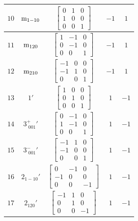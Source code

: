 \documentclass[fleqn,8pt]{jsarticle}
\begin{document}
\begin{longtable}{ccccc}
$ 10 $ & $ {\rm m}_{1-10} $ & $ \begin{bmatrix} 0 & 1 & 0 \\ 1 & 0 & 0 \\ 0 & 0 & 1 \end{bmatrix} $ & $ -1 $ & $ 1 $ \\ \hline
$ 11 $ & $ {\rm m}_{120} $ & $ \begin{bmatrix} 1 & -1 & 0 \\ 0 & -1 & 0 \\ 0 & 0 & 1 \end{bmatrix} $ & $ -1 $ & $ 1 $ \\ \hline
$ 12 $ & $ {\rm m}_{210} $ & $ \begin{bmatrix} -1 & 0 & 0 \\ -1 & 1 & 0 \\ 0 & 0 & 1 \end{bmatrix} $ & $ -1 $ & $ 1 $ \\ \hline
$ 13 $ & $ 1{}' $ & $ \begin{bmatrix} 1 & 0 & 0 \\ 0 & 1 & 0 \\ 0 & 0 & 1 \end{bmatrix} $ & $ 1 $ & $ -1 $ \\ \hline
$ 14 $ & $ 3^{+}_{\,\,001}{}' $ & $ \begin{bmatrix} 0 & -1 & 0 \\ 1 & -1 & 0 \\ 0 & 0 & 1 \end{bmatrix} $ & $ 1 $ & $ -1 $ \\ \hline
$ 15 $ & $ 3^{-}_{\,\,001}{}' $ & $ \begin{bmatrix} -1 & 1 & 0 \\ -1 & 0 & 0 \\ 0 & 0 & 1 \end{bmatrix} $ & $ 1 $ & $ -1 $ \\ \hline
$ 16 $ & $ 2{}_{1-10}{}' $ & $ \begin{bmatrix} 0 & -1 & 0 \\ -1 & 0 & 0 \\ 0 & 0 & -1 \end{bmatrix} $ & $ 1 $ & $ -1 $ \\ \hline
$ 17 $ & $ 2{}_{120}{}' $ & $ \begin{bmatrix} -1 & 1 & 0 \\ 0 & 1 & 0 \\ 0 & 0 & -1 \end{bmatrix} $ & $ 1 $ & $ -1 $ \\ \hline

\end{longtable}
\end{document}
